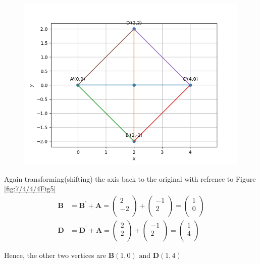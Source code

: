 \documentclass[12pt]{article}
\newcommand{\myvec}[1]{\ensuremath{\begin{pmatrix}#1\end{pmatrix}}}
\let\vec\mathbf
\begin{document}
\begin{figure}[!h]
	\begin{center} 
	    \includegraphics[width=\columnwidth]{chapters/10/7/4/4/figs/square3}
	\end{center}
\caption{}
\label{fig:7/4/4/4Fig4}
\end{figure}

Again transforming(shifting) the axis back to the original with refrence to Figure \ref{fig:7/4/4/4Fig5}
\begin{align}
\vec{B} &= \vec{B^{\prime}}+\vec{A} = \myvec{
2 \\
-2\\
}+\myvec{
-1 \\
2\\
} = 
\myvec{
1 \\
0\\
}\\
\vec{D} &= \vec{D^{\prime}}+\vec{A} = \myvec{
2 \\
2\\
}+\myvec{
-1 \\
2\\
} = 
\myvec{
1 \\
4 \\
}
\end{align}

Hence, the other two vertices are $\vec{B}(1,0) \text{ and } \vec{D}(1,4)$   
\end{document}
